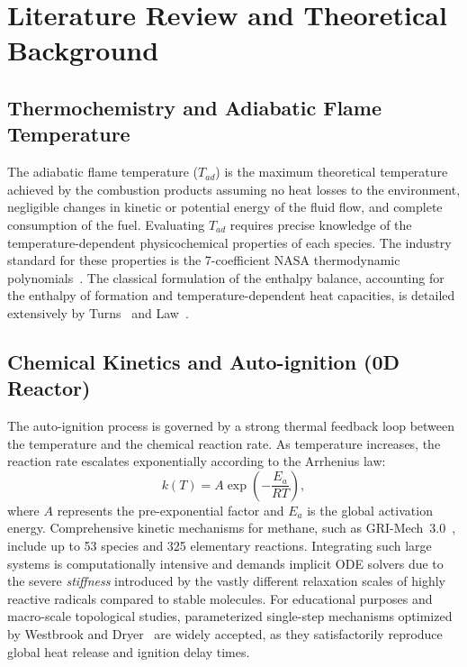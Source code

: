 \documentclass[11pt,a4paper]{article}
\begin{document}
\section{Literature Review and Theoretical Background}

\subsection{Thermochemistry and Adiabatic Flame Temperature}
The adiabatic flame temperature ($T_{ad}$) is the maximum theoretical temperature achieved by the
combustion products assuming no heat losses to the environment, negligible changes in kinetic or
potential energy of the fluid flow, and complete consumption of the fuel. Evaluating $T_{ad}$ requires
precise knowledge of the temperature-dependent physicochemical properties of each species. The industry
standard for these properties is the 7-coefficient NASA thermodynamic polynomials~\cite{nasa}. The classical
formulation of the enthalpy balance, accounting for the enthalpy of formation and temperature-dependent
heat capacities, is detailed extensively by Turns~\cite{turns} and Law~\cite{law}.

\subsection{Chemical Kinetics and Auto-ignition (0D Reactor)}
The auto-ignition process is governed by a strong thermal feedback loop between the temperature and
the chemical reaction rate. As temperature increases, the reaction rate escalates exponentially
according to the Arrhenius law:
\begin{equation}
  k(T) = A \exp\!\left(-\frac{E_a}{R T}\right),
\end{equation}
where $A$ represents the pre-exponential factor and $E_a$ is the global activation energy. Comprehensive
kinetic mechanisms for methane, such as GRI-Mech~3.0~\cite{grimech}, include up to 53 species and 325
elementary reactions. Integrating such large systems is computationally intensive and demands implicit
ODE solvers due to the severe \emph{stiffness} introduced by the vastly different relaxation scales
of highly reactive radicals compared to stable molecules. For educational purposes and macro-scale
topological studies, parameterized single-step mechanisms optimized by Westbrook and Dryer~\cite{westbrook}
are widely accepted, as they satisfactorily reproduce global heat release and ignition delay times.
\end{document}
